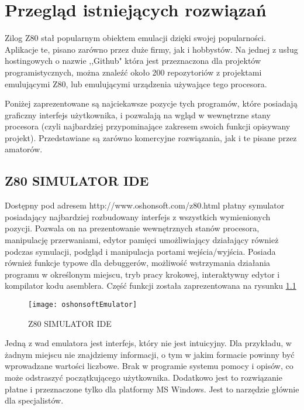 \chapter{Przegląd istniejących rozwiązań}
	Zilog Z80 stał popularnym obiektem emulacji dzięki swojej popularności. Aplikacje te, pisano zarówno przez duże firmy, jak i hobbystów. Na jednej z usług hostingowych o nazwie ,,Github"  która jest przeznaczona dla projektów programistycznych, można znaleźć około 200 repozytoriów z projektami emulującymi Z80, lub emulującymi urządzenia używające tego procesora\cite{githubZ80Emulators}.   
	
	Poniżej zaprezentowane są najciekawsze pozycje tych programów, które posiadają graficzny interfejs użytkownika, i pozwalają na wgląd w  wewnętrzne stany procesora (czyli najbardziej przypominające zakresem swoich funkcji opisywany projekt). Przedstawiane są zarówno komercyjne rozwiązania, jak i te pisane przez amatorów.
	
	\section{Z80 SIMULATOR IDE}
	Dostępny pod adresem http://www.oshonsoft.com/z80.html płatny symulator posiadający najbardziej rozbudowany interfejs z wszystkich wymienionych pozycji. Pozwala on na prezentowanie wewnętrznych stanów procesora, manipulację przerwaniami, edytor pamięci umożliwiający działający również podczas symulacji, podgląd i manipulacja portami wejścia/wyjścia. Posiada również funkcje typowe dla debuggerów, możliwość wstrzymania działania programu w określonym miejscu, tryb pracy krokowej, interaktywny edytor i kompilator kodu asemblera\cite{oshonsoftEmulator}. Część funkcji została zaprezentowana na rysunku \ref{img:oshonsoftEmulator} 
	
	\begin{figure}[h]
		\centering
		\texttt{[image: oshonsoftEmulator]}
		\caption{Z80 SIMULATOR IDE \cite{oshonsoftEmulator}}
		\label{img:oshonsoftEmulator}
	\end{figure}
	
	Jedną z wad emulatora jest interfejs, który nie jest intuicyjny. Dla przykładu, w żadnym miejscu nie znajdziemy informacji, o tym w jakim formacie powinny być wprowadzane wartości liczbowe. Brak w programie systemu pomocy i opisów, co może odstraszyć początkującego użytkownika. Dodatkowo jest to rozwiązanie płatne i przeznaczone tylko dla platformy MS Windows. Jest to narzędzie głównie dla specjalistów.
	
